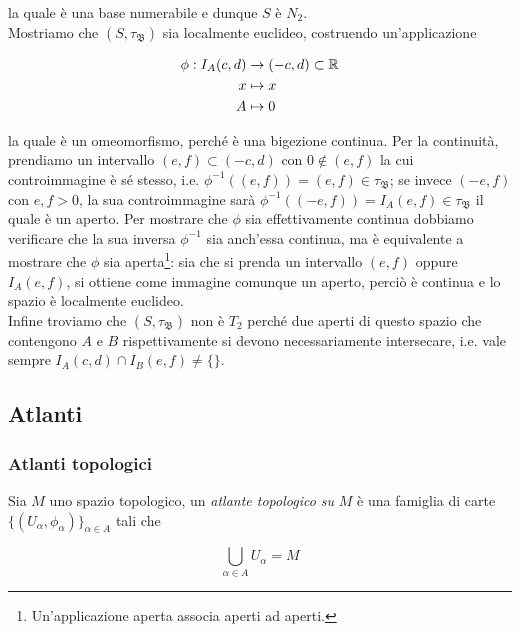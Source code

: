 la quale è una base numerabile e dunque $ S $ è $ N_{2} $.\\
Mostriamo che $ (S,\tau_{\mathfrak{B}}) $ sia localmente euclideo, costruendo un'applicazione

\begin{align}
	\begin{split}
		\phi : I_{A}(c,d) &\to (-c,d) \subset \mathbb{R}\\
		x &\mapsto x\\
		A &\mapsto 0
	\end{split}
\end{align}

la quale è un omeomorfismo, perché è una bigezione continua. Per la continuità, prendiamo un intervallo $ (e,f) \subset (-c,d) $ con $ 0 \notin (e,f) $ la cui controimmagine è sé stesso, i.e. $ \phi^{-1}((e,f)) = (e,f) \in \tau_{\mathfrak{B}} $; se invece $ (-e,f) $ con $ e,f>0 $, la sua controimmagine sarà $ \phi^{-1}((-e,f)) = I_{A}(e,f) \in \tau_{\mathfrak{B}} $ il quale è un aperto. Per mostrare che $ \phi $ sia effettivamente continua dobbiamo verificare che la sua inversa $ \phi^{-1} $ sia anch'essa continua, ma è equivalente a mostrare che $ \phi $ sia aperta\footnote{%
	Un'applicazione aperta associa aperti ad aperti.%
}: sia che si prenda un intervallo $ (e,f) $ oppure $ I_{A}(e,f) $, si ottiene come immagine comunque un aperto, perciò è continua e lo spazio è localmente euclideo.\\
Infine troviamo che $ (S,\tau_{\mathfrak{B}}) $ non è $ T_{2} $ perché due aperti di questo spazio che contengono $ A $ e $ B $ rispettivamente si devono necessariamente intersecare, i.e. vale sempre $ I_{A}(c,d) \cap I_{B}(e,f) \neq \{\} $.

\subsection{Atlanti}

\subsubsection{Atlanti topologici}

Sia $ M $ uno spazio topologico, un \textit{atlante topologico su} $ M $ è una famiglia di carte $ \{(U_{\alpha},\phi_{\alpha})\}_{\alpha \in A} $ tali che

\begin{equation}
	\bigcup_{\alpha \in A} U_{\alpha} = M
\end{equation}

